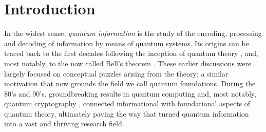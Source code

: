 \chapter*{Introduction}
\thispagestyle{empty}
\label{chap:introduction}

In the widest sense, \emph{quantum information} is the study of the encoding, processing and decoding of information by means of quantum systems. Its origins can be traced back to the first decades following the inception of quantum theory \cite{epr,schrodinger_entanglement_1935,bohm_hiddenvariables_1952}, and, most notably, to the now called Bell's theorem \cite{bell_1964}. These earlier discussions were largely focused on conceptual puzzles arising from the theory; a similar motivation that now grounds the field we call quantum foundations. During the 80's and 90's, groundbreaking results in quantum computing and, most notably, quantum cryptography \cite{bb84,ekert91}, connected informational with foundational aspects of quantum theory, ultimately paving the way that turned quantum information into a vast and thriving research field.

